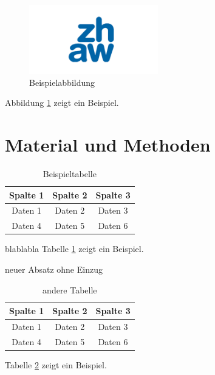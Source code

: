 \documentclass[a4paper,11pt,twoside]{article}
\begin{document}
	\begin{figure}[b] %
		\raggedright %
		\includegraphics[width=0.5\textwidth]{zhawGR_logo.png} %
		\caption{Beispielabbildung}
		\label{fig:beispiel}
	\end{figure}
	Abbildung \ref{fig:beispiel} zeigt ein Beispiel.
	
	
	\newpage
	\section{Material und Methoden}
	\begin{table}[ht]
		\raggedright
		\caption{Beispieltabelle}
		\begin{tabular}{|c|c|c|}
			\hline
			Spalte 1 & Spalte 2 & Spalte 3 \\ \hline
			Daten 1  & Daten 2  & Daten 3  \\ \hline
			Daten 4  & Daten 5  & Daten 6  \\ \hline
		\end{tabular}
		\label{tab:beispiel}
	\end{table} 
	\noindent %
	blablabla Tabelle \ref{tab:beispiel} zeigt ein Beispiel.
	\\%
	\par\noindent neuer Absatz ohne Einzug
	\begin{table}[ht]
		\centering
		\begin{tabular}{|c|c|c|}
			\hline
			Spalte 1 & Spalte 2 & Spalte 3 \\ \hline
			Daten 1  & Daten 2  & Daten 3  \\ \hline
			Daten 4  & Daten 5  & Daten 6  \\ \hline
		\end{tabular}
		\caption{andere Tabelle}
		\label{tab:andere}
	\end{table}
	\par\noindent  Tabelle \ref{tab:andere} zeigt ein Beispiel.
	
\end{document}
